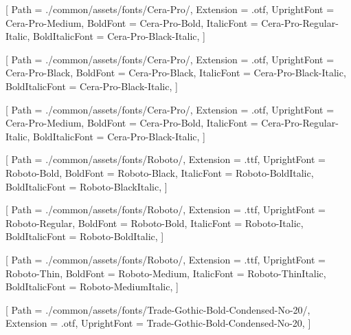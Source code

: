 
\contourlength{0.8pt}

\renewcommand{\ULdepth}{3.8pt}

\setmainfont{Cera-Pro-Medium}[
Path = ./common/assets/fonts/Cera-Pro/,
Extension = .otf,
UprightFont = Cera-Pro-Medium,
BoldFont = Cera-Pro-Bold,
ItalicFont = Cera-Pro-Regular-Italic,
BoldItalicFont = Cera-Pro-Black-Italic,
]


[
Path = ./common/assets/fonts/Cera-Pro/,
Extension = .otf,
UprightFont = Cera-Pro-Black,
BoldFont = Cera-Pro-Black,
ItalicFont = Cera-Pro-Black-Italic,
BoldItalicFont = Cera-Pro-Black-Italic,
]

[
Path = ./common/assets/fonts/Cera-Pro/,
Extension = .otf,
UprightFont = Cera-Pro-Medium,
BoldFont = Cera-Pro-Bold,
ItalicFont = Cera-Pro-Regular-Italic,
BoldItalicFont = Cera-Pro-Black-Italic,
]

[
Path = ./common/assets/fonts/Roboto/,
Extension = .ttf,
UprightFont = Roboto-Bold,
BoldFont = Roboto-Black,
ItalicFont = Roboto-BoldItalic,
BoldItalicFont = Roboto-BlackItalic,
]

[
Path = ./common/assets/fonts/Roboto/,
Extension = .ttf,
UprightFont = Roboto-Regular,
BoldFont = Roboto-Bold,
ItalicFont = Roboto-Italic,
BoldItalicFont = Roboto-BoldItalic,
]

[
Path = ./common/assets/fonts/Roboto/,
Extension = .ttf,
UprightFont = Roboto-Thin,
BoldFont = Roboto-Medium,
ItalicFont = Roboto-ThinItalic,
BoldItalicFont = Roboto-MediumItalic,
]

[
Path = ./common/assets/fonts/Trade-Gothic-Bold-Condensed-No-20/,
Extension = .otf,
UprightFont = Trade-Gothic-Bold-Condensed-No-20,
]